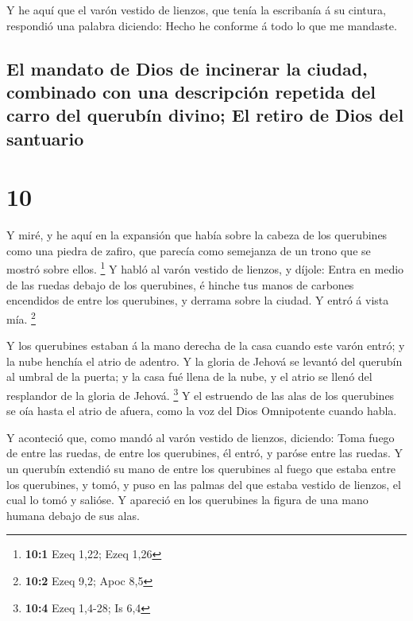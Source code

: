  Y he aquí que el varón vestido de lienzos, que tenía la
escribanía á su cintura, respondió una palabra diciendo: Hecho he
conforme á todo lo que me mandaste.

\hypertarget{el-mandato-de-dios-de-incinerar-la-ciudad-combinado-con-una-descripciuxf3n-repetida-del-carro-del-querubuxedn-divino-el-retiro-de-dios-del-santuario}{%
\subsection{El mandato de Dios de incinerar la ciudad, combinado con una
descripción repetida del carro del querubín divino; El retiro de Dios
del
santuario}\label{el-mandato-de-dios-de-incinerar-la-ciudad-combinado-con-una-descripciuxf3n-repetida-del-carro-del-querubuxedn-divino-el-retiro-de-dios-del-santuario}}

\hypertarget{section-9}{%
\section{10}\label{section-9}}

 Y miré, y he aquí en la expansión que había sobre la cabeza
de los querubines como una piedra de zafiro, que parecía como semejanza
de un trono que se mostró sobre ellos. \footnote{\textbf{10:1} Ezeq
  1,22; Ezeq 1,26}  Y habló al varón vestido de lienzos, y
díjole: Entra en medio de las ruedas debajo de los querubines, é hinche
tus manos de carbones encendidos de entre los querubines, y derrama
sobre la ciudad. Y entró á vista mía. \footnote{\textbf{10:2} Ezeq 9,2;
  Apoc 8,5}

 Y los querubines estaban á la mano derecha de la casa
cuando este varón entró; y la nube henchía el atrio de adentro.
 Y la gloria de Jehová se levantó del querubín al umbral de
la puerta; y la casa fué llena de la nube, y el atrio se llenó del
resplandor de la gloria de Jehová. \footnote{\textbf{10:4} Ezeq 1,4-28;
  Is 6,4}  Y el estruendo de las alas de los querubines se
oía hasta el atrio de afuera, como la voz del Dios Omnipotente cuando
habla.

 Y aconteció que, como mandó al varón vestido de lienzos,
diciendo: Toma fuego de entre las ruedas, de entre los querubines, él
entró, y paróse entre las ruedas.  Y un querubín extendió su
mano de entre los querubines al fuego que estaba entre los querubines, y
tomó, y puso en las palmas del que estaba vestido de lienzos, el cual lo
tomó y salióse.  Y apareció en los querubines la figura de
una mano humana debajo de sus alas.

